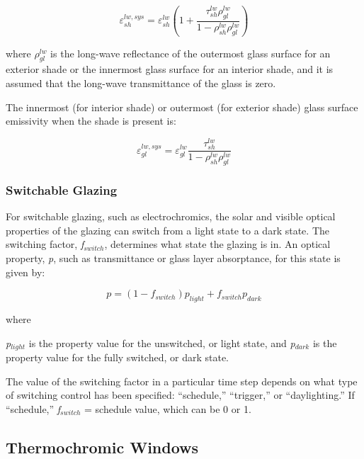 \begin{equation}
\varepsilon_{sh}^{lw,sys} = \varepsilon_{sh}^{lw}\left( {1 + \frac{{\tau_{sh}^{lw}\rho_{gl}^{lw}}}{{1 - \rho_{sh}^{lw}\rho_{gl}^{lw}}}} \right)
\end{equation}

where \(\rho_{gl}^{lw}\) is the long-wave reflectance of the outermost glass surface for an exterior shade or the innermost glass surface for an interior shade, and it is assumed that the long-wave transmittance of the glass is zero.

The innermost (for interior shade) or outermost (for exterior shade) glass surface emissivity when the shade is present is:

\begin{equation}
\varepsilon_{gl}^{lw,sys} = \varepsilon_{gl}^{lw}\frac{{\tau_{sh}^{lw}}}{{1 - \rho_{sh}^{lw}\rho_{gl}^{lw}}}
\end{equation}

\subsubsection{Switchable Glazing}\label{switchable-glazing}

For switchable glazing, such as electrochromics, the solar and visible optical properties of the glazing can switch from a light state to a dark state. The switching factor, \emph{f\(_{switch}\)}, determines what state the glazing is in. An optical property, \emph{p}, such as transmittance or glass layer absorptance, for this state is given by:

\begin{equation}
p = (1 - {f_{switch}}){p_{light}} + {f_{switch}}{p_{dark}}
\end{equation}

where

\emph{p\(_{light}\)} is the property value for the unswitched, or light state, and \emph{p\(_{dark}\)} is the property value for the fully switched, or dark state.

The value of the switching factor in a particular time step depends on what type of switching control has been specified: ``schedule,'' ``trigger,'' or ``daylighting.'' If ``schedule,'' \emph{f\(_{switch}\)} = schedule value, which can be 0 or 1.

\subsection{Thermochromic Windows}\label{thermochromic-windows}

